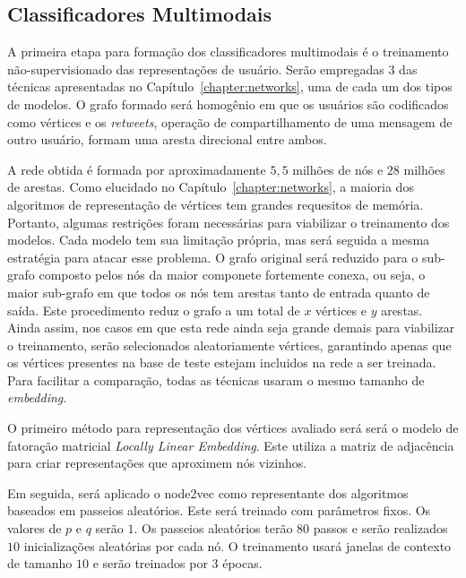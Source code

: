 \subsection{Classificadores Multimodais}
\label{sec:multimodal-classifier}


A primeira etapa para formação dos classificadores multimodais é o treinamento
não-supervisionado das representações de usuário.
Serão empregadas 3 das técnicas apresentadas no Capítulo~\ref{chapter:networks},
uma de cada um dos tipos de modelos.
O grafo formado será homogênio em que os usuários são codificados como vértices
e os \textit{retweets}, operação de compartilhamento de uma mensagem de outro
usuário, formam uma aresta direcional entre ambos.

A rede obtida é formada por aproximadamente $5,5$ milhões de nós e $28$ milhões
de arestas.
Como elucidado no Capítulo~\ref{chapter:networks}, a maioria dos algoritmos de
representação de vértices tem grandes requesitos de memória.
Portanto, algumas restrições foram necessárias para viabilizar o treinamento dos
modelos.
Cada modelo tem sua limitação própria, mas será seguida a mesma estratégia para
atacar esse problema.
O grafo original será reduzido para o sub-grafo composto pelos nós da maior
componete fortemente conexa, ou seja, o maior sub-grafo em que todos os nós
tem arestas tanto de entrada quanto de saída.
Este procedimento reduz o grafo a um total de $x$ vértices e $y$ arestas.
Ainda assim, nos casos em que esta rede ainda seja grande demais para viabilizar
o treinamento, serão selecionados aleatoriamente vértices, garantindo apenas que
os vértices presentes na base de teste estejam incluidos na rede a ser treinada.
Para facilitar a comparação, todas as técnicas usaram o mesmo tamanho de
\textit{embedding}.

O primeiro método para representação dos vértices avaliado será será o modelo de
fatoração matricial \textit{Locally Linear Embedding}.
Este utiliza a matriz de adjacência para criar representações que aproximem nós
vizinhos.

Em seguida, será aplicado o node2vec como representante dos algoritmos baseados
em passeios aleatórios.
Este será treinado com parâmetros fixos.
Os valores de $p$ e $q$ serão $1$.
Os passeios aleatórios terão $80$ passos e serão realizados $10$ inicializações
aleatórias por cada nó.
O treinamento usará janelas de contexto de tamanho $10$ e serão treinados por
$3$ épocas.


